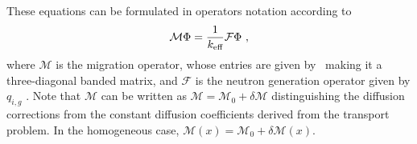 These equations can be formulated in operators notation according to
\begin{equation}\label{eq:op-not}
\mathcal{M}\Phi=\frac{1}{{k_{\textrm{\scriptsize{eff}}}}}\mathcal{F}\Phi \,\, ,
\end{equation}
where $\mathcal{M}$ is the migration operator, whose entries are given by~ making it a three-diagonal banded matrix, and $\mathcal{F}$ is the neutron generation operator given by  $q_{i,g}$ . Note that $\mathcal{M}$ can be written as $\mathcal{M}=\mathcal{M}_0+\delta\mathcal{M}$ distinguishing the diffusion corrections from the constant diffusion coefficients derived from the transport problem. In the homogeneous case, $\mathcal{M}(x)=\mathcal{M}_0+\delta\mathcal{M}(x)$.
%
%
\subsection{}
\label{sec:calc-int-curr}

